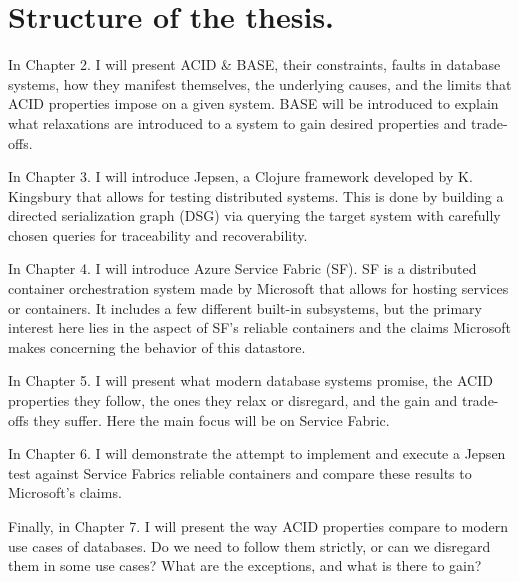 \documentclass[a4paper,10pt,titlepage]{report}
\begin{document}
\section{Structure of the thesis.}

    In Chapter 2. I will present ACID \& BASE, their constraints, faults in database systems, how they manifest themselves, the underlying causes, and the limits that ACID properties impose on a given system. BASE will be introduced to explain what relaxations are introduced to a system to gain desired properties and trade-offs.\\
    \vspace{5mm}

    In Chapter 3. I will introduce Jepsen, a Clojure framework\cite{jepsonio} developed by K. Kingsbury that allows for testing distributed systems. This is done by building a directed serialization graph (DSG) via querying the target system with carefully chosen queries for traceability and recoverability.  \\
    \vspace{5mm}

    In Chapter 4. I will introduce Azure Service Fabric (SF). SF is a distributed container orchestration system made by Microsoft that allows for hosting services or containers. It includes a few different built-in subsystems, but the primary interest here lies in the aspect of SF's reliable containers and the claims Microsoft makes concerning the behavior of this datastore.\\
    \vspace{5mm}

    In Chapter 5. I will present what modern database systems promise, the ACID properties they follow, the ones they relax or disregard, and the gain and trade-offs they suffer. Here the main focus will be on Service Fabric.\\
    \vspace{5mm}

    In Chapter 6.  I will demonstrate the attempt to implement and execute a Jepsen test against Service Fabrics reliable containers and compare these results to Microsoft's claims.\\
    \vspace{5mm}

    Finally, in Chapter 7. I will present the way ACID properties compare to modern use cases of databases. Do we need to follow them strictly, or can we disregard them in some use cases? What are the exceptions, and what is there to gain?\\
\end{document}

